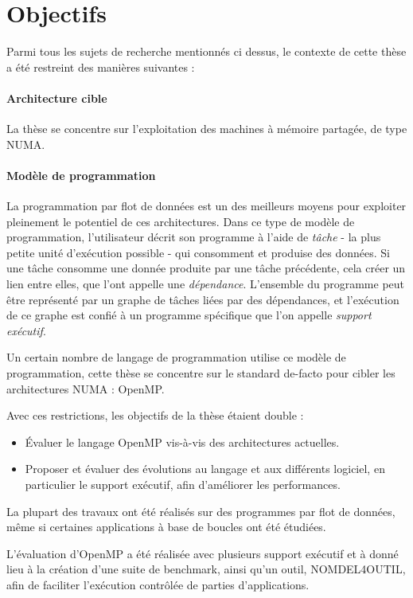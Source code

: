 \section{Objectifs}\label{sec:intro:objectives}

Parmi tous les sujets de recherche mentionnés ci dessus, le contexte de cette thèse a été restreint des manières suivantes :

\paragraph{Architecture cible}
La thèse se concentre sur l'exploitation des machines à mémoire partagée, de type NUMA.

\paragraph{Modèle de programmation}
La programmation par flot de données est un des meilleurs moyens pour exploiter pleinement le potentiel de ces architectures.
Dans ce type de modèle de programmation, l'utilisateur décrit son programme à l'aide de \emph{tâche} - la plus petite unité d'exécution possible - qui consomment et produise des données.
Si une tâche consomme une donnée produite par une tâche précédente, cela créer un lien entre elles, que l'ont appelle une \emph{dépendance}.
L'ensemble du programme peut être représenté par un graphe de tâches liées par des dépendances, et l'exécution de ce graphe est confié à un programme spécifique que l'on appelle \emph{support exécutif}.

Un certain nombre de langage de programmation utilise ce modèle de programmation, cette thèse se concentre sur le standard de-facto pour cibler les architectures NUMA : OpenMP.

Avec ces restrictions, les objectifs de la thèse étaient double :
\begin{itemize}
 \item Évaluer le langage OpenMP vis-à-vis des architectures actuelles.
 \item Proposer et évaluer des évolutions au langage et aux différents logiciel, en particulier le support exécutif, afin d'améliorer les performances.
\end{itemize}

La plupart des travaux ont été réalisés sur des programmes par flot de données, même si certaines applications à base de boucles ont été étudiées.

L'évaluation d'OpenMP a été réalisée avec plusieurs support exécutif et à donné lieu à la création d'une suite de benchmark, ainsi qu'un outil, NOMDEL4OUTIL, afin de faciliter l'exécution contrôlée de parties d'applications.

